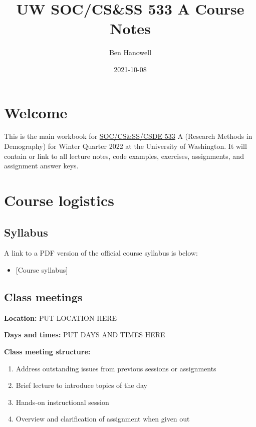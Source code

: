 \documentclass[
]{book}
\title{UW SOC/CS\&SS 533 A Course Notes}
\author{Ben Hanowell}
\date{2021-10-08}
\providecommand{\tightlist}{%
  \setlength{\itemsep}{0pt}\setlength{\parskip}{0pt}}
\begin{document}
\maketitle

{
\setcounter{tocdepth}{1}
\tableofcontents
}
\hypertarget{welcome}{%
\chapter*{Welcome}\label{welcome}}

This is the main workbook for \href{https://soc.washington.edu/courses/2019/winter/soc/533/a}{SOC/CS\&SS/CSDE 533} A (Research Methods in Demography) for Winter Quarter 2022 at the University of Washington. It will contain or link to all lecture notes, code examples, exercises, assignments, and assignment answer keys.

\hypertarget{course-logistics}{%
\chapter*{Course logistics}\label{course-logistics}}

\hypertarget{syllabus}{%
\section*{Syllabus}\label{syllabus}}

A link to a PDF version of the official course syllabus is below:

\begin{itemize}
\tightlist
\item
  {[}Course syllabus{]}
\end{itemize}

\hypertarget{class-meetings}{%
\section*{Class meetings}\label{class-meetings}}

\textbf{Location:} PUT LOCATION HERE

\textbf{Days and times:} PUT DAYS AND TIMES HERE

\textbf{Class meeting structure:}

\begin{enumerate}
\def\labelenumi{\arabic{enumi}.}
\tightlist
\item
  Address outstanding issues from previous sessions or assignments
\item
  Brief lecture to introduce topics of the day
\item
  Hands-on instructional session
\item
  Overview and clarification of assignment when given out
\end{enumerate}
\end{document}
